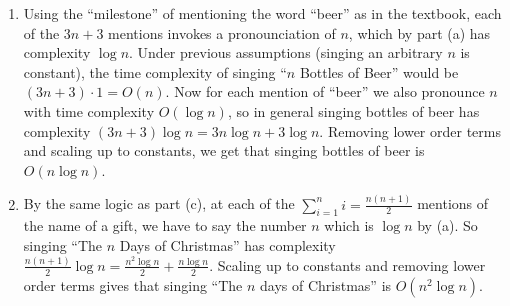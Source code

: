 \begin{solution}
\begin{enumerate}[label=(\alph*)]
\item Using the ``milestone'' of mentioning the word ``beer'' as in the textbook, each of the $3n+3$ mentions invokes a pronounciation of $n$, which by part (a) has complexity $\log n$. Under previous assumptions (singing an arbitrary $n$ is constant), the time complexity of singing ``$n$ Bottles of Beer'' would be $(3 n+3)\cdot 1=O(n)$. Now for each mention of ``beer'' we also pronounce $n$ with time complexity $O(\log n)$, so in general singing bottles of beer has complexity $(3 n+3)\log n=3n \log n +3 \log n$. Removing lower order terms and scaling up to constants, we get that singing bottles of beer is $O(n \log n)$.
\item By the same logic as part (c), at each of the $\sum _{i=1}^n  i=\frac{n(n+1)}{2}$ mentions of the name of a gift, we have to say the number $n$ which is $\log n$ by (a). So singing ``The $n$ Days of Christmas'' has complexity $\frac{n(n+1)}{2}\log n=\frac{n^2 \log n}{2}+ \frac{n \log n}{2}$. Scaling up to constants and removing lower order terms gives that singing ``The $n$ days of Christmas'' is $O(n^2 \log n)$.
    \end{enumerate}
\end{solution}
